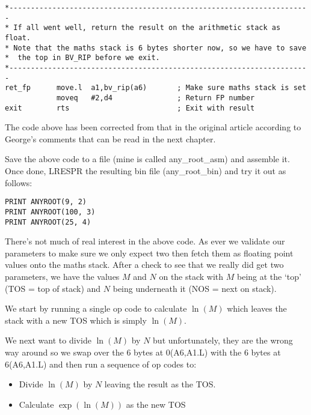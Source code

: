 \begin{lstlisting}[firstnumber=1,caption={The Maths Package - Calculate Any Root},label={lst:MathsPackageAnyRoot}]
*----------------------------------------------------------------------
* If all went well, return the result on the arithmetic stack as float.
* Note that the maths stack is 6 bytes shorter now, so we have to save
*  the top in BV_RIP before we exit.
*----------------------------------------------------------------------
ret_fp      move.l  a1,bv_rip(a6)       ; Make sure maths stack is set
            moveq   #2,d4               ; Return FP number
exit        rts                         ; Exit with result
\end{lstlisting}

\begin{note}
The code above has been corrected from that in the original
      article according to George's comments that can be read in the next
      chapter.
\end{note}

Save the above code to a file (mine is called any\_root\_asm) and
    assemble it. Once done, LRESPR the resulting bin file (any\_root\_bin) and
    try it out as follows:

\begin{lstlisting}[firstnumber=1,language={}]
PRINT ANYROOT(9, 2)
PRINT ANYROOT(100, 3)
PRINT ANYROOT(25, 4)
\end{lstlisting}

There's not much of real interest in the above code. As ever we
    validate our parameters to make sure we only expect two then fetch them as
    floating point values onto the maths stack. After a check to see that we
    really did get two parameters, we have the values $M$ and $N$ on the stack
    with $M$ being at the `top' (TOS = top of stack) and $N$ being underneath it
    (NOS = next on stack).

We start by running a single op code to calculate $\ln(M)$ which
    leaves the stack with a new TOS which is simply $\ln(M)$.

We next want to divide $\ln(M)$ by $N$ but unfortunately, they are the
    wrong way around so we swap over the 6 bytes at 0(A6,A1.L) with the 6
    bytes at 6(A6,A1.L) and then run a sequence of op codes to:
\begin{itemize}[itemsep=0pt]

\item{}Divide $\ln(M)$ by $N$ leaving the result as the TOS.


\item{}Calculate $\exp(\ln(M))$ as the new TOS

\end{itemize}

